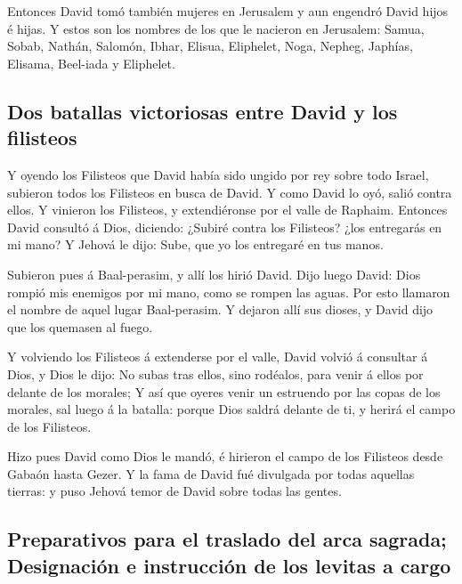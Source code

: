  Entonces David tomó también mujeres en Jerusalem y aun
engendró David hijos é hijas.  Y estos son los nombres de
los que le nacieron en Jerusalem: Samua, Sobab, Nathán, Salomón,
 Ibhar, Elisua, Eliphelet,  Noga, Nepheg,
Japhías,  Elisama, Beel-iada y Eliphelet.

\hypertarget{dos-batallas-victoriosas-entre-david-y-los-filisteos}{%
\subsection{Dos batallas victoriosas entre David y los
filisteos}\label{dos-batallas-victoriosas-entre-david-y-los-filisteos}}

 Y oyendo los Filisteos que David había sido ungido por rey
sobre todo Israel, subieron todos los Filisteos en busca de David. Y
como David lo oyó, salió contra ellos.  Y vinieron los
Filisteos, y extendiéronse por el valle de Raphaim. 
Entonces David consultó á Dios, diciendo: ¿Subiré contra los Filisteos?
¿los entregarás en mi mano? Y Jehová le dijo: Sube, que yo los entregaré
en tus manos.

 Subieron pues á Baal-perasim, y allí los hirió David. Dijo
luego David: Dios rompió mis enemigos por mi mano, como se rompen las
aguas. Por esto llamaron el nombre de aquel lugar Baal-perasim.
 Y dejaron allí sus dioses, y David dijo que los quemasen
al fuego.

 Y volviendo los Filisteos á extenderse por el valle,
 David volvió á consultar á Dios, y Dios le dijo: No subas
tras ellos, sino rodéalos, para venir á ellos por delante de los
morales;  Y así que oyeres venir un estruendo por las copas
de los morales, sal luego á la batalla: porque Dios saldrá delante de
ti, y herirá el campo de los Filisteos.

 Hizo pues David como Dios le mandó, é hirieron el campo de
los Filisteos desde Gabaón hasta Gezer.  Y la fama de David
fué divulgada por todas aquellas tierras: y puso Jehová temor de David
sobre todas las gentes.

\hypertarget{preparativos-para-el-traslado-del-arca-sagrada-designaciuxf3n-e-instrucciuxf3n-de-los-levitas-a-cargo}{%
\subsection{Preparativos para el traslado del arca sagrada; Designación
e instrucción de los levitas a
cargo}\label{preparativos-para-el-traslado-del-arca-sagrada-designaciuxf3n-e-instrucciuxf3n-de-los-levitas-a-cargo}}

